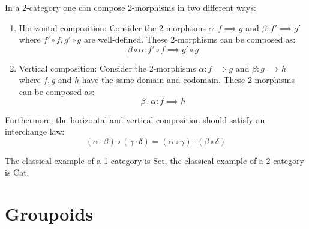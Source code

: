 	\begin{example}[2-Category]
		In a 2-category one can compose 2-morphisms in two different ways:
		\begin{enumerate}
			\item Horizontal composition:
			Consider the 2-morphisms $\alpha:f\implies g$ and $\beta:f'\implies g'$ where $f'\circ f, g'\circ g$ are well-defined. These 2-morphisms can be composed as: \[\beta\circ\alpha: f'\circ f\implies g'\circ g\]
			\item Vertical composition:
			Consider the 2-morphisms $\alpha:f\implies g$ and $\beta:g\implies h$ where $f, g$ and $h$ have the same domain and codomain. These 2-morphisms can be composed as: \[\beta\cdot\alpha: f\implies h\]
		\end{enumerate}
		Furthermore, the horizontal and vertical composition should satisfy an interchange law:
		\begin{equation}
			(\alpha\cdot\beta)\circ(\gamma\cdot\delta) = (\alpha\circ\gamma)\cdot(\beta\circ\delta)
		\end{equation}
	\end{example}
	
	
	\begin{example}
		The classical example of a 1-category is Set, the classical example of a 2-category is Cat.
	\end{example}

\section{Groupoids}

	
